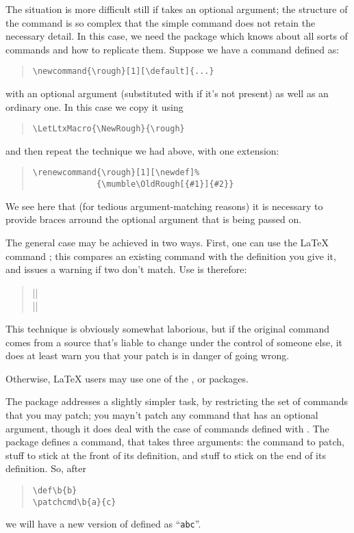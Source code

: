 The situation is more difficult still if  takes an
optional argument; the structure of the command is so complex that the
simple  command does not retain the necessary detail.  In
this case, we need the  package which knows about all
sorts of \latex{} commands and how to replicate them.  Suppose we have
a command defined as:
\begin{quote}
\begin{verbatim}
\newcommand{\rough}[1][\default]{...}
\end{verbatim}
\end{quote}
with an optional argument (substituted with  if it's not
present) as well as an ordinary one.  In this case we copy it using
\begin{quote}
\begin{verbatim}
\LetLtxMacro{\NewRough}{\rough}
\end{verbatim}
\end{quote}
and then repeat the technique we had above, with one extension:
\begin{quote}
\begin{verbatim}
\renewcommand{\rough}[1][\newdef]%
             {\mumble\OldRough[{#1}]{#2}}
\end{verbatim}
\end{quote}
We see here that (for tedious argument-matching reasons) it is
necessary to provide braces arround the optional argument that is
being passed on.

The general case may be achieved in two ways.  First, one can use the
\LaTeX{} command ; this compares an existing command
with the definition you give it, and issues a warning if two don't
match.  Use is therefore:
\begin{quote}
  ||\\
  |\renewcommand{\complex}{|\meta{new definition}|}|
\end{quote}
This technique is obviously somewhat laborious, but if the original
command comes from a source that's liable to change under the control
of someone else, it does at least warn you that your patch is in
danger of going wrong.

Otherwise, \LaTeX{} users may use one of the ,
 or  packages.

The  package addresses a slightly simpler task, by
restricting the set of commands that you may patch; you mayn't patch
any command that has an optional argument, though it does deal with
the case of commands defined with .  The
package defines a  command, that takes three
arguments: the command to patch, stuff to stick at the front of its
definition, and stuff to stick on the end of its definition.  So,
after
\begin{quote}
\begin{verbatim}
\def\b{b}
\patchcmd\b{a}{c}
\end{verbatim}
\end{quote}
we will have a new version of  defined as ``\texttt{abc}''.

